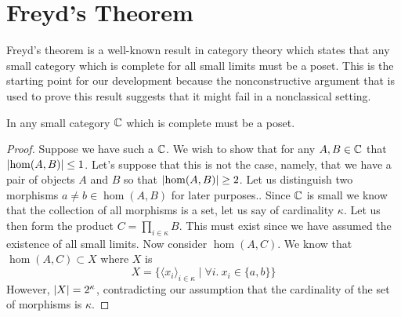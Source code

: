 \section{Freyd's Theorem}\label{sec:freyd}

Freyd's theorem is a well-known result in category theory which states
that any small category which is complete for all small limits must be
a poset. This is the starting point for our development because the
nonconstructive argument that is used to prove this result suggests
that it might fail in a nonclassical setting.
\begin{thm}\label{thm:freyd:freyd}
  In any small category $\mathbb{C}$ which is complete must be a poset.
\end{thm}
\begin{proof}
  Suppose we have such a $\mathbb{C}$. We wish to show that for any
  $A, B \in \mathbb{C}$ that $\left\vert\hom(A, B)\right\vert \le 1$. Let's suppose that
  this is not the case, namely, that we have a pair of objects $A$ and
  $B$ so that $\left\vert\hom(A, B)\right\vert \ge 2$. Let us distinguish two
  morphisms $a \neq b \in \hom(A, B)$ for later purposes.. Since
  $\mathbb{C}$ is small we know that the collection of all morphisms is a
  set, let us say of cardinality $\kappa$. Let us then form the
  product $C = \prod_{i \in \kappa} B$. This must exist since we have
  assumed the existence of all small limits. Now consider
  $\hom(A, C)$. We know that $\hom(A, C) \subset X$ where $X$ is
  \[
    X = \{\langle x_i \rangle_{i \in \kappa}\mid \forall i.\ x_i \in \{a, b\}\}
  \]
  However, $\left\vert X\right\vert = 2^\kappa$, contradicting our assumption that
  the cardinality of the set of morphisms is $\kappa$.
\end{proof}

